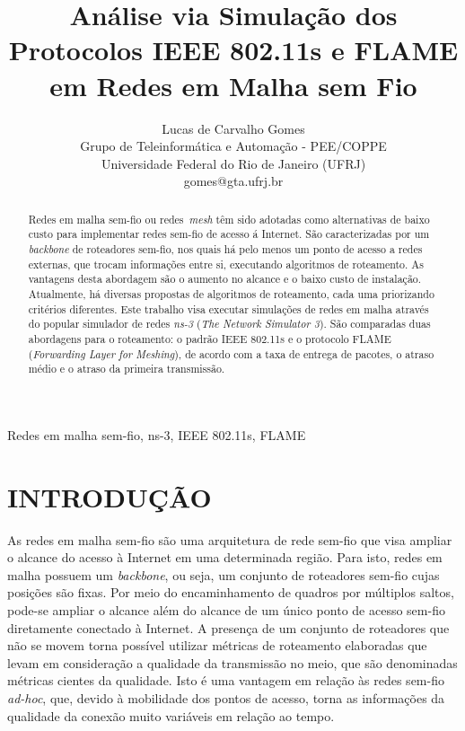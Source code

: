 \documentclass[letterpaper, 10 pt, conference]{ieeeconf}  %
\title{\LARGE \bf
Análise via Simulação dos Protocolos IEEE 802.11s e FLAME em Redes em Malha sem Fio
}
\author{Lucas de Carvalho Gomes%
\\Grupo de Teleinformática e Automação - PEE/COPPE
\\Universidade Federal do Rio de Janeiro (UFRJ)
\\gomes@gta.ufrj.br
}
\begin{document}


\maketitle
\thispagestyle{empty}
\pagestyle{empty}


\begin{abstract}

Redes em malha sem-fio ou redes~\textit{mesh} têm sido adotadas como alternativas de baixo custo para implementar redes sem-fio de acesso á Internet. São caracterizadas por um \textit{backbone} de roteadores sem-fio, nos quais há pelo menos um ponto de acesso a redes externas, que trocam informações entre si, executando algoritmos de roteamento. As vantagens desta abordagem são o aumento no alcance e o baixo custo de instalação. Atualmente, há diversas propostas de algoritmos de roteamento, cada uma priorizando critérios diferentes. Este trabalho visa executar simulações de redes em malha através do popular simulador de redes \textit{ns-3} (\textit{The Network Simulator 3}). São comparadas duas abordagens para o roteamento: o padrão IEEE 802.11s e o protocolo FLAME (\textit{Forwarding Layer for Meshing}), de acordo com a taxa de entrega de pacotes, o atraso médio e o atraso da primeira transmissão.

\end{abstract}

\begin{keywords}
Redes em malha sem-fio, ns-3, IEEE 802.11s, FLAME
\end{keywords}

\section{INTRODUÇÃO}
\label{sec:intro}

As redes em malha sem-fio são uma arquitetura de rede sem-fio que visa ampliar o alcance do acesso à Internet em uma determinada região. Para isto, redes em malha possuem um \textit{backbone}, ou seja, um conjunto de roteadores sem-fio cujas posições são fixas. Por meio do encaminhamento de quadros por múltiplos saltos, pode-se ampliar o alcance além do alcance de um único ponto de acesso sem-fio diretamente conectado à Internet. A presença de um conjunto de roteadores que não se movem torna possível utilizar métricas de roteamento elaboradas que levam em consideração a qualidade da transmissão no meio, que são denominadas métricas cientes da qualidade. Isto é uma vantagem em relação às redes sem-fio \textit{ad-hoc}, que, devido à mobilidade dos pontos de acesso, torna as informações da qualidade da conexão muito variáveis em relação ao tempo.
\end{document}
